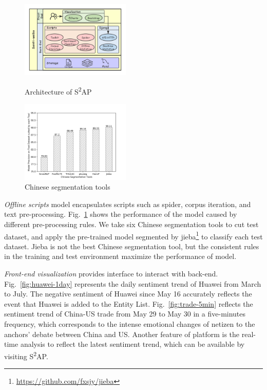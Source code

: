 \documentclass[runningheads]{llncs}
\begin{document}
\begin{figure}[ht]
\vspace{-0.5cm}   %
\centering
\begin{minipage}[t]{0.43\textwidth}
\centering
\includegraphics[width=5.2cm]{images/Architecture-of-Senti-weibo-3.png}
\caption{Architecture of S\textsuperscript{2}AP}
\label{fig:Senti-weibo}
\end{minipage}
\begin{minipage}[t]{0.43\textwidth}
\centering
\includegraphics[width=5.2cm]{images/model-precision-on-test-dataset-cutted-by-each-tool.png}
\caption{Chinese segmentation tools}
\label{fig:segmentation-tools-precision}
\end{minipage}
\end{figure}

\textit{Offline scripts} model encapsulates scripts such as spider, corpus iteration, and text pre-processing. Fig.~\ref{fig:segmentation-tools-precision} shows the performance of the model caused by different pre-processing rules. We take six Chinese segmentation tools to cut test dataset, and apply the pre-trained model segmented by jieba\footnote{\url{https://github.com/fxsjy/jieba}} to classify each test dataset. Jieba is not the best Chinese segmentation tool, but the consistent rules in the training and test environment maximize the performance of model.



\textit{Front-end visualization} provides interface to interact with back-end. Fig.~\ref{fig:huawei-1day} represents the daily sentiment trend of Huawei from March to July. The negative sentiment of Huawei since May 16 accurately reflects the event that Huawei is added to the Entity List. Fig.~\ref{fig:trade-5min} reflects the sentiment trend of China-US trade from May 29 to May 30 in a five-minutes frequency, which corresponds to the intense emotional changes of netizen to the anchors' debate between China and US. Another feature of  platform is the real-time analysis to reflect the latest sentiment trend, which can be available by visiting S\textsuperscript{2}AP.
\end{document}
